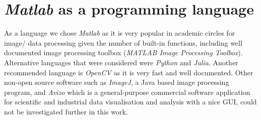 %
%
%	
%	


\section{\textit{Matlab} as a programming language}

As a language we chose \textit{Matlab} as it is very popular in academic circles for image/ data processing given the number of built-in functions, including well documented image processing toolbox (\textit{MATLAB Image Processing Toolbox}).
Alternative languages that were considered were \textit{Python} and \textit{Julia}. Another recommended language is \textit{OpenCV} as it is very fast and well documented. Other non-open source software such as \textit{ImageJ}, a Java based image processing program, and \textit{Avizo} which is a general-purpose commercial software application for scientific and industrial data visualisation and analysis with a nice GUI, could not be investigated further in this work. 


